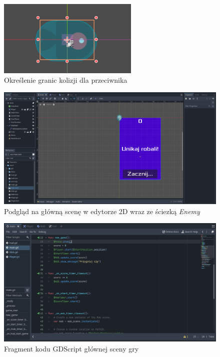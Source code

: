 \documentclass[a4paper]{article}
\begin{document}
\begin{center}
	\begin{figure}[htb]
		\centering
		\includegraphics[width=0.6\textwidth]{enemy_collision.png}
		\caption{Określenie granic kolizji dla przeciwnika}
	\end{figure}
	\begin{figure}[htb]
		\centering
		\includegraphics[width=\textwidth]{mob_path.png}
		\caption{Podgląd na główną scenę w edytorze 2D wraz ze ściezką \emph{Enemy}}
	\end{figure}
	\begin{figure}
		\centering
		\includegraphics[width=\textwidth]{code.png}
		\caption{Fragment kodu GDScript głównej sceny gry}
	\end{figure}

\end{center}
\end{document}
